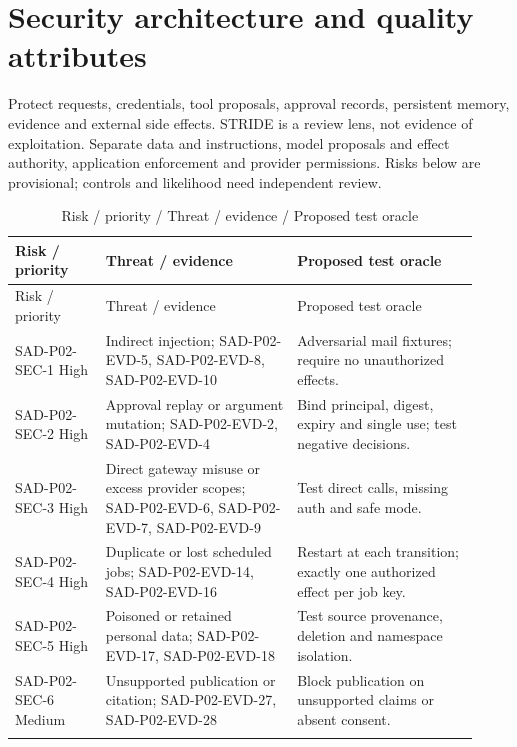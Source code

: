 \documentclass[10pt,letterpaper]{article}
\begin{document}
\section{Security architecture and quality attributes}
Protect requests, credentials, tool proposals, approval records, persistent memory, evidence and external side effects. STRIDE is a review lens, not evidence of exploitation. Separate data and instructions, model proposals and effect authority, application enforcement and provider permissions. Risks below are provisional; controls and likelihood need independent review.
\begin{longtable}{@{}>{\raggedright\arraybackslash}p{0.18\linewidth}>{\raggedright\arraybackslash}p{0.38\linewidth}>{\raggedright\arraybackslash}p{0.36\linewidth}@{}}
\caption{Risk / priority / Threat / evidence / Proposed test oracle}\\
\toprule Risk / priority & Threat / evidence & Proposed test oracle\\\midrule\endfirsthead
\toprule Risk / priority & Threat / evidence & Proposed test oracle\\\midrule\endhead
SAD-P02-SEC-1 High & Indirect injection; SAD-P02-EVD-5, SAD-P02-EVD-8, SAD-P02-EVD-10 & Adversarial mail fixtures; require no unauthorized effects.\\\addlinespace
SAD-P02-SEC-2 High & Approval replay or argument mutation; SAD-P02-EVD-2, SAD-P02-EVD-4 & Bind principal, digest, expiry and single use; test negative decisions.\\\addlinespace
SAD-P02-SEC-3 High & Direct gateway misuse or excess provider scopes; SAD-P02-EVD-6, SAD-P02-EVD-7, SAD-P02-EVD-9 & Test direct calls, missing auth and safe mode.\\\addlinespace
SAD-P02-SEC-4 High & Duplicate or lost scheduled jobs; SAD-P02-EVD-14, SAD-P02-EVD-16 & Restart at each transition; exactly one authorized effect per job key.\\\addlinespace
SAD-P02-SEC-5 High & Poisoned or retained personal data; SAD-P02-EVD-17, SAD-P02-EVD-18 & Test source provenance, deletion and namespace isolation.\\\addlinespace
SAD-P02-SEC-6 Medium & Unsupported publication or citation; SAD-P02-EVD-27, SAD-P02-EVD-28 & Block publication on unsupported claims or absent consent.\\\addlinespace
\bottomrule\end{longtable}
\end{document}

